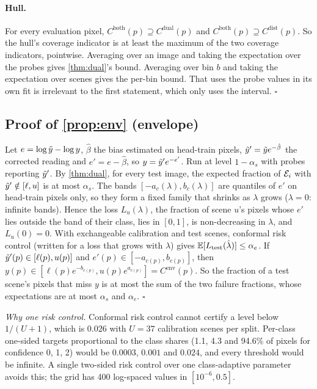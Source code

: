 \paragraph{Hull.}
For every evaluation pixel, $C^{\text{both}}(p)\supseteq C^{\text{dual}}(p)$ and $C^{\text{both}}(p)\supseteq C^{\text{dist}}(p)$.
So the hull's coverage indicator is at least the maximum of the two coverage indicators, pointwise.
Averaging over an image and taking the expectation over the probes gives \cref{thm:dual}'s bound.
Averaging over bin $b$ and taking the expectation over scenes gives the per-bin bound.
That \mDistSplit uses the probe values in its own fit is irrelevant to the first statement, which only uses the \mDual interval. \hfill$\square$

\subsection{Proof of \cref{prop:env} (envelope)}
\label{app:proof-env}
Let $e=\log\tilde{y}-\log y$, $\hat\beta$ the bias estimated on head-train pixels, $\tilde{y}'=\tilde{y} e^{-\hat\beta}$ the corrected reading and $e'=e-\hat\beta$, so $y=\tilde{y}'e^{-e'}$.
Run \mDual at level $1-\alpha_s$ with probes reporting $\tilde{y}'$.
By \cref{thm:dual}, for every test image, the expected fraction of $\mathcal{E}_i$ with $\tilde{y}'\notin[\ell,u]$ is at most $\alpha_s$.
The bands $[-a_c(\lambda),b_c(\lambda)]$ are quantiles of $e'$ on head-train pixels only, so they form a fixed family that shrinks as $\lambda$ grows ($\lambda=0$: infinite bands).
Hence the loss $L_u(\lambda)$, the fraction of scene $u$'s pixels whose $e'$ lies outside the band of their class, lies in $[0,1]$, is non-decreasing in $\lambda$, and $L_u(0)=0$.
With exchangeable calibration and test scenes, conformal risk control (written for a loss that grows with $\lambda$) gives $\mathbb{E}[L_{\text{test}}(\hat\lambda)]\le\alpha_e$.
If $\tilde{y}'(p)\in[\ell(p),u(p)]$ and $e'(p)\in[-a_{c(p)},b_{c(p)}]$, then $y(p)\in[\ell(p)e^{-b_{c(p)}},u(p)e^{a_{c(p)}}]=C^{\text{env}}(p)$.
So the fraction of a test scene's pixels that miss $y$ is at most the sum of the two failure fractions, whose expectations are at most $\alpha_s$ and $\alpha_e$. \hfill$\square$

\noindent\emph{Why one risk control.} Conformal risk control cannot certify a level below $1/(U+1)$, which is $0.026$ with $U=37$ calibration scenes per split.
Per-class one-sided targets proportional to the class shares (1.1, 4.3 and 94.6\% of pixels for confidence 0, 1, 2) would be $0.0003$, $0.001$ and $0.024$, and every threshold would be infinite.
A single two-sided risk control over one class-adaptive parameter avoids this; the grid has 400 log-spaced values in $[10^{-6},0.5]$.

